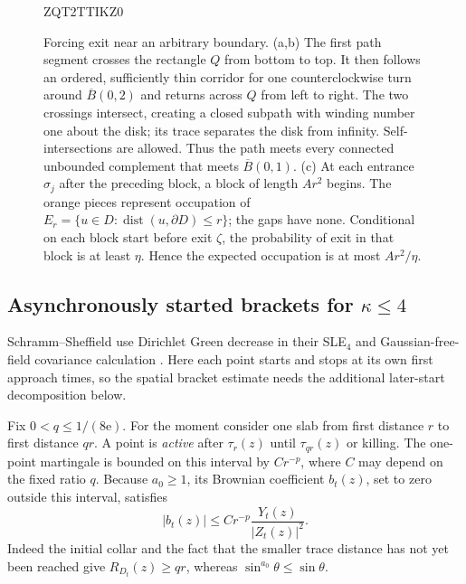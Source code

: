 \documentclass[11pt]{article}
\theoremstyle{definition}
\theoremstyle{remark}
\numberwithin{equation}{section}
\begin{document}
\begin{figure}[tbp]

\begingroup
{}
ZQT2TTIKZ0
\endgroup

\caption{
Forcing exit near an arbitrary boundary. (a,b) The first path segment crosses the rectangle $Q$ from bottom to top. It then follows an ordered, sufficiently thin corridor for one counterclockwise turn around $\overline B(0,2)$ and returns across $Q$ from left to right. The two crossings intersect, creating a closed subpath with winding number one about the disk; its trace separates the disk from infinity. Self-intersections are allowed. Thus the path meets every connected unbounded complement that meets $\overline B(0,1)$. (c) At each entrance $\sigma_j$ after the preceding block, a block of length $Ar^2$ begins. The orange pieces represent occupation of $E_r=\{u\in D:\operatorname{dist}(u,\partial D)\le r\}$; the gaps have none. Conditional on each block start before exit $\zeta$, the probability of exit in that block is at least $\eta$. Hence the expected occupation is at most $Ar^2/\eta$.
}
\label{fig:brownian-circuit}
\end{figure}
 

\subsection{Asynchronously started brackets for
\texorpdfstring{$\kappa\le4$}{kappa at most four}}

Schramm--Sheffield use Dirichlet Green decrease in their SLE$_4$
and Gaussian-free-field covariance calculation
\cite[Lemmas~2.5--2.6]{schrammsheffield2013}.
Here each point starts and stops at its own first approach times, so
the spatial bracket estimate needs the additional later-start
decomposition below.

Fix $0<q\le1/(8\mathrm e)$.  For the moment consider one
slab from first distance $r$ to first distance $qr$.  A point is
\emph{active} after $\tau_r(z)$ until $\tau_{qr}(z)$ or killing.  The
one-point martingale is bounded on this interval by $C r^{-p}$, where
$C$ may depend on the fixed ratio $q$.  Because $a_0\ge1$, its Brownian
coefficient $b_t(z)$, set to zero outside this interval, satisfies
\begin{equation}
 |b_t(z)|\le C r^{-p}\frac{Y_t(z)}{|Z_t(z)|^2}.
 \label{mesh:active-coefficient}
\end{equation}
Indeed the initial collar and the fact that the smaller trace
distance has not yet been reached give $R_{D_t}(z)\ge qr$, whereas
$\sin^{a_0}\theta\le\sin\theta$.
\end{document}
